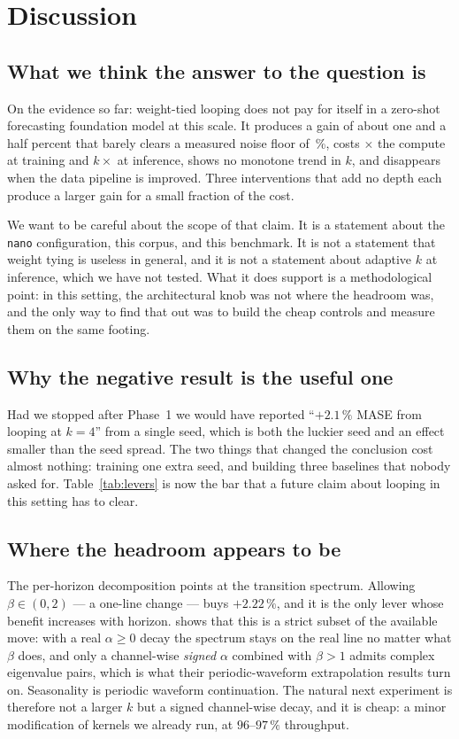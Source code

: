 \section{Discussion}
\label{sec:discussion}

\subsection{What we think the answer to the question is}

On the evidence so far: weight-tied looping does not pay for itself in a
zero-shot forecasting foundation model at this scale. It produces a gain of
about one and a half percent that barely clears a measured noise floor of
\NoiseFloorKFour\,\%, costs \CostRatio$\times$ the compute at training and
$k\times$ at inference, shows no monotone trend in $k$, and disappears when the
data pipeline is improved. Three interventions that add no depth each produce a
larger gain for a small fraction of the cost.

We want to be careful about the scope of that claim. It is a statement about
the \texttt{nano} configuration, this corpus, and this benchmark. It is not a
statement that weight tying is useless in general, and it is not a statement
about adaptive $k$ at inference, which we have not tested. What it does
support is a methodological point: in this setting, the architectural knob was
not where the headroom was, and the only way to find that out was to build the
cheap controls and measure them on the same footing.

\subsection{Why the negative result is the useful one}

Had we stopped after Phase~1 we would have reported ``$+2.1\,\%$ MASE from
looping at $k=4$'' from a single seed, which is both the luckier seed and an
effect smaller than the seed spread. The two things that changed the conclusion
cost almost nothing: training one extra seed, and building three baselines that
nobody asked for. Table~\ref{tab:levers} is now the bar that a future claim
about looping in this setting has to clear.

\subsection{Where the headroom appears to be}

The per-horizon decomposition points at the transition spectrum. Allowing
$\beta\in(0,2)$ --- a one-line change --- buys $+2.22\,\%$, and it is the only
lever whose benefit increases with horizon. \citet{ckda2026} shows that this is
a strict subset of the available move: with a real $\alpha \ge 0$ decay the
spectrum stays on the real line no matter what $\beta$ does, and only a
channel-wise \emph{signed} $\alpha$ combined with $\beta>1$ admits complex
eigenvalue pairs, which is what their periodic-waveform extrapolation results
turn on. Seasonality is periodic waveform continuation. The natural next
experiment is therefore not a larger $k$ but a signed channel-wise decay, and
it is cheap: a minor modification of kernels we already run, at
$96$--$97\,\%$ throughput.

